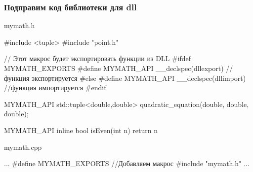 \documentclass[9pt, aspectratio=1610]{beamer}
\begin{document}
\begin{frame}[fragile]\frametitle{Подправим код библиотеки для dll}
	
	\begin{block}{mymath.h}
		\begin{cppcode}
			#include <tuple>
			#include "point.h"
			
			// Этот макрос будет экспортировать функции из DLL
			#ifdef MYMATH_EXPORTS
				#define MYMATH_API __declspec(dllexport) //функция экспортируется
			#else
				#define MYMATH_API __declspec(dllimport) //функция импортируется
			#endif
			
			MYMATH_API std::tuple<double,double> quadratic_equation(double, double, double);
			
			MYMATH_API inline bool isEven(int n) {
				return n %
			}
		\end{cppcode}
		
	\end{block}
	
	\begin{block}{mymath.cpp}
		\begin{cppcode}
			...	
			#define MYMATH_EXPORTS //Добавляем макрос
			#include "mymath.h"
			...
		\end{cppcode}
		
	\end{block}
	
\end{frame}
\end{document}
